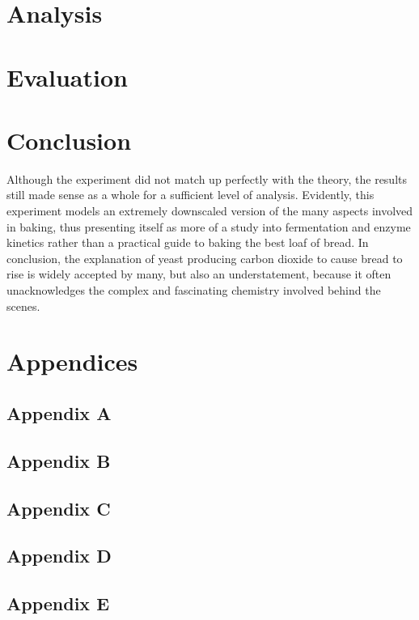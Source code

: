 \documentclass{article}
\begin{document}
\section{Analysis}

\section{Evaluation}

\section{Conclusion}
Although the experiment did not match up perfectly with the theory, the results still made sense as a whole for a sufficient level of analysis. Evidently, this experiment models an extremely downscaled version of the many aspects involved in baking, thus presenting itself as more of a study into fermentation and enzyme kinetics rather than a practical guide to baking the best loaf of bread. In conclusion, the explanation of yeast producing carbon dioxide to cause bread to rise is widely accepted by many, but also an understatement, because it often unacknowledges the complex and fascinating chemistry involved behind the scenes.

\nocite{*}

\newpage

\printbibliography

\newpage

\section{Appendices}

\subsection{Appendix A}

\subsection{Appendix B}

\subsection{Appendix C}

\subsection{Appendix D}

\subsection{Appendix E}
\end{document}
